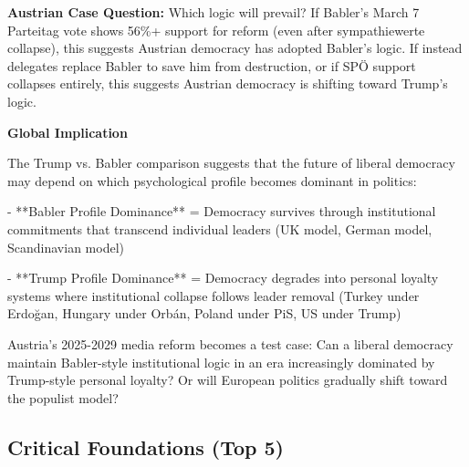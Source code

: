 \textbf{Austrian Case Question:} Which logic will prevail? If Babler's March 7 Parteitag vote shows 56\%+ support
for reform (even after sympathiewerte collapse), this suggests Austrian democracy has adopted Babler's logic.
If instead delegates replace Babler to save him from destruction, or if SPÖ support collapses entirely, this
suggests Austrian democracy is shifting toward Trump's logic.

\vspace{0.5cm}

\textbf{Global Implication}

The Trump vs. Babler comparison suggests that the future of liberal democracy may depend on which psychological
profile becomes dominant in politics:

- **Babler Profile Dominance** = Democracy survives through institutional commitments that transcend individual leaders
  (UK model, German model, Scandinavian model)

- **Trump Profile Dominance** = Democracy degrades into personal loyalty systems where institutional collapse follows
  leader removal (Turkey under Erdoğan, Hungary under Orbán, Poland under PiS, US under Trump)

Austria's 2025-2029 media reform becomes a test case: Can a liberal democracy maintain Babler-style institutional
logic in an era increasingly dominated by Trump-style personal loyalty? Or will European politics gradually shift
toward the populist model?


\subsection{Critical Foundations (Top 5)}

